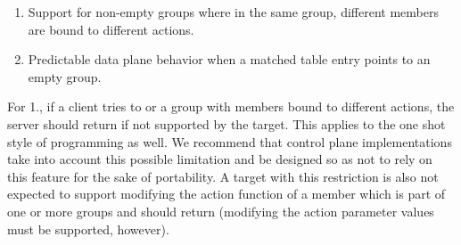 \documentclass[11pt]{article}
\begin{document}
{%
\begin{enumerate}[noitemsep,topsep=\mdcompacttopsep]%

\item{}Support for non-empty groups where in the same group, different members are
bound to different actions.%

\item{}Predictable data plane behavior when a matched table entry points to an empty
group.%
\end{enumerate}%

\noindent{}For 1., if a client tries to  or  a group with members bound to
different actions, the server should return  if not supported by
the target. This applies to the one shot style of programming as well. We
recommend that control plane implementations take into account this possible
limitation and be designed so as not to rely on this feature for the sake of
portability. A target with this restriction is also not expected to support
modifying the action function of a member which is part of one or more groups
and should return  (modifying the action parameter values must be
supported, however).%

}
\end{document}

